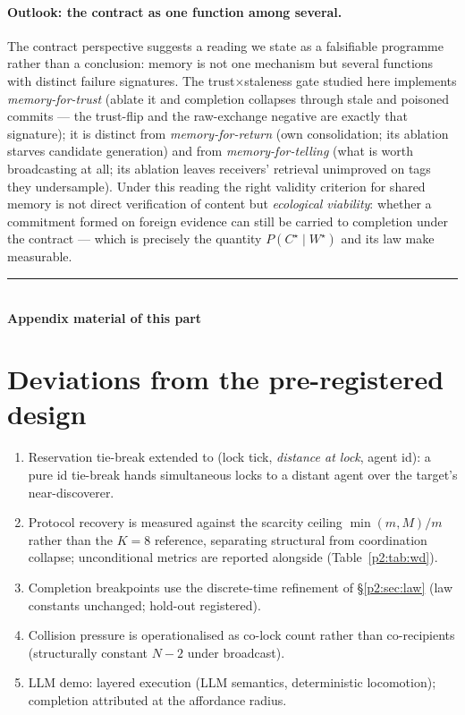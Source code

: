 \documentclass{article}
\newcommand{\wstar}{W^{\star}}
\newcommand{\cstar}{C^{\star}}
\begin{document}
\paragraph{Outlook: the contract as one function among several.}
The contract perspective suggests a reading we state as a
falsifiable programme rather than a conclusion: memory is not one
mechanism but several functions with distinct failure signatures.
The trust$\times$staleness gate studied here implements
\emph{memory-for-trust} (ablate it and completion collapses through
stale and poisoned commits --- the trust-flip and the raw-exchange
negative are exactly that signature); it is distinct from
\emph{memory-for-return} (own consolidation; its ablation starves
candidate generation) and from \emph{memory-for-telling} (what is
worth broadcasting at all; its ablation leaves receivers'
retrieval unimproved on tags they undersample). Under this reading
the right validity criterion for shared memory is not direct
verification of content but \emph{ecological viability}: whether a
commitment formed on foreign evidence can still be carried to
completion under the contract --- which is precisely the quantity
$P(\cstar \mid \wstar)$ and its law make measurable.

\FloatBarrier
\begin{center}\rule{0.55\linewidth}{0.4pt}\\[2pt]\textbf{Appendix material of this part}\end{center}


\section{Deviations from the pre-registered design}
\label{p2:app:deviations}
\begin{enumerate}[leftmargin=20pt,itemsep=2pt,topsep=2pt]
\item Reservation tie-break extended to (lock tick, \emph{distance at
  lock}, agent id): a pure id tie-break hands simultaneous locks to a
  distant agent over the target's near-discoverer.
\item Protocol recovery is measured against the scarcity ceiling
  $\min(m,M)/m$ rather than the $K{=}8$ reference, separating
  structural from coordination collapse; unconditional metrics are
  reported alongside (Table~\ref{p2:tab:wd}).
\item Completion breakpoints use the discrete-time refinement of
  \S\ref{p2:sec:law} (law constants unchanged; hold-out registered).
\item Collision pressure is operationalised as co-lock count rather
  than co-recipients (structurally constant $N{-}2$ under broadcast).
\item LLM demo: layered execution (LLM semantics, deterministic
  locomotion); completion attributed at the affordance radius.
\end{enumerate}
\end{document}
